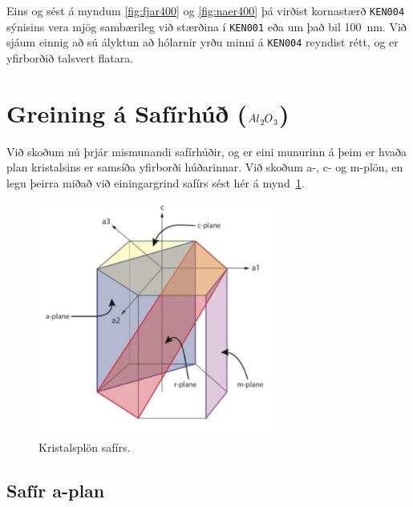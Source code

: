 \documentclass[11pt]{article}
\begin{document}
Eins og sést á myndum  \ref{fig:fjar400} og \ref{fig:naer400} þá virðist kornastærð {\tt KEN004} sýnisins vera mjög sambærileg við stærðina í {\tt KEN001} eða um það bil \SI{100}{nm}. Við sjáum einnig að sú ályktun að hólarnir yrðu minni á {\tt KEN004} reyndist rétt, og er yfirborðið talsvert flatara.


\section{Greining á Safírhúð ($Al\ce{_{2}}O\ce{_3}$)}

Við skoðum nú þrjár mismunandi safírhúðir, og er eini munurinn á þeim er hvaða plan kristalsins er samsíða yfirborði húðarinnar. Við skoðum a-, c- og m-plön, en legu þeirra miðað við einingargrind safírs sést hér á mynd~\ref{fig:Safir plon}.

\begin{figure}[H]
  \centering
    \includegraphics[width=80mm]{Safir_planes.PNG}
    \caption{Kristalsplön safírs.}
    \label{fig:Safir plon}
\end{figure}

\subsection*{Safír a-plan}
\end{document}
